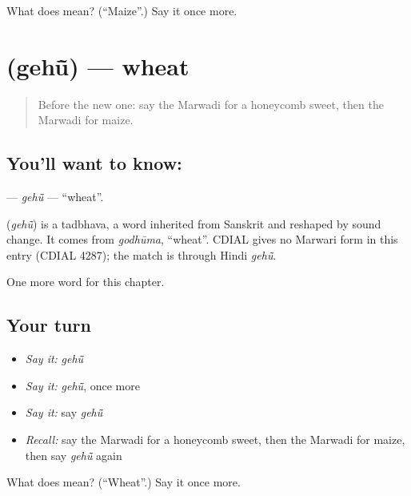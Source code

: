 \begin{tcolorbox}[breakable,colback=teal!4,colframe=teal!35!black,title={Before you move on}]
What does  mean? (\textquotedblleft{}Maize\textquotedblright{}.) Say it once more.
\end{tcolorbox}
\section[\texorpdfstring{\mw{गेहूं} (gehū̃)}{गेहूं (gehū̃)}]{ (gehū̃) — wheat}

\label{lesson:MW-C132-gehu}



\begin{quote}
Before the new one: say the Marwadi for a honeycomb sweet, then the Marwadi for maize.
\end{quote}

\subsection*{You'll want to know: }
\textbf{} — \emph{gehū̃} — \textquotedblleft{}wheat\textquotedblright{}.

\begin{cousinweb}
\textbf{} (\emph{gehū̃}) is a tadbhava, a word inherited from Sanskrit and reshaped by sound change. It comes from \emph{godhūma}, \textquotedblleft{}wheat\textquotedblright{}. CDIAL gives no Marwari form in this entry (CDIAL 4287); the match is through Hindi \emph{gehū̃}.
\end{cousinweb}

\begin{grammarlens}[title={What you've built}]
One more word for this chapter.
\end{grammarlens}

\subsection*{Your turn}
\begin{itemize}
\raggedright
  \item \emph{Say it:} \emph{gehū̃}
  \item \emph{Say it:} \emph{gehū̃}, once more
  \item \emph{Say it:} say \emph{gehū̃}
  \item \emph{Recall:} say the Marwadi for a honeycomb sweet, then the Marwadi for maize, then say \emph{gehū̃} again
\end{itemize}

\begin{tcolorbox}[breakable,colback=teal!4,colframe=teal!35!black,title={Before you move on}]
What does  mean? (\textquotedblleft{}Wheat\textquotedblright{}.) Say it once more.
\end{tcolorbox}
